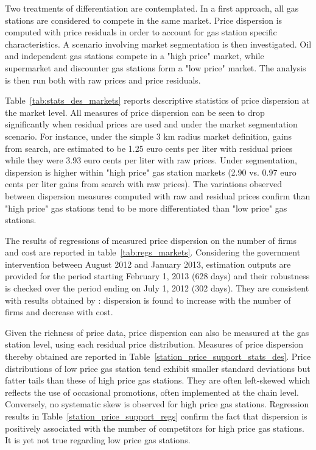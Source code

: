 \documentclass[english]{article}
\begin{document}
Two treatments of differentiation are contemplated. In a first approach, all gas stations are considered to compete in the same market. Price dispersion is computed with price residuals in order to account for gas station specific characteristics. A scenario involving market segmentation is then investigated. Oil and independent gas stations compete in a "high price" market, while supermarket and discounter gas stations form a "low price" market. The analysis is then run both with raw prices and price residuals.

Table~\ref{tab:stats_des_markets} reports descriptive statistics of price dispersion at the market level. All measures of price dispersion can be seen to drop significantly when residual prices are used and under the market segmentation scenario. For instance, under the simple 3 km radius market definition, gains from search, are estimated to be 1.25 euro cents per liter with residual prices while they were 3.93 euro cents per liter with raw prices. Under segmentation, dispersion is higher within "high price" gas station markets (2.90 vs. 0.97 euro cents per liter gains from search with raw prices). The variations observed between dispersion measures computed with raw and residual prices confirm than "high price" gas stations tend to be more differentiated than "low price" gas stations.

The results of regressions of measured price dispersion on the number of firms and cost are reported in table~\ref{tab:regs_markets}. Considering the government intervention between August 2012 and January 2013, estimation outputs are provided for the period starting February 1, 2013 (628 days) and their robustness is checked over the period ending on July 1, 2012 (302 days). They are consistent with results obtained by \cite{TAP11}: dispersion is found to increase with the number of firms and decrease with cost.

Given the richness of price data, price dispersion can also be measured at the gas station level, using each residual price distribution. Measures of price dispersion thereby obtained are reported in Table~\ref{station_price_support_stats_des}. Price distributions of low price gas station tend exhibit smaller standard deviations but fatter tails than these of high price gas stations. They are often left-skewed which reflects the use of occasional promotions, often implemented at the chain level. Conversely, no systematic skew is observed for high price gas stations. Regression results in Table~\ref{station_price_support_regs} confirm the fact that dispersion is positively associated with the number of competitors for high price gas stations. It is yet not true regarding low price gas stations.
\end{document}
